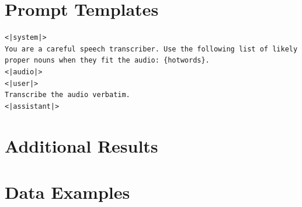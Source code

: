 \section{Prompt Templates}
\label{app:prompts}

\begin{lstlisting}[caption={Contextual ASR prompt with a hot-word list.}]
<|system|>
You are a careful speech transcriber. Use the following list of likely
proper nouns when they fit the audio: {hotwords}.
<|audio|>
<|user|>
Transcribe the audio verbatim.
<|assistant|>
\end{lstlisting}

\section{Additional Results}
\label{app:more_results}


\section{Data Examples}
\label{app:data_examples}

